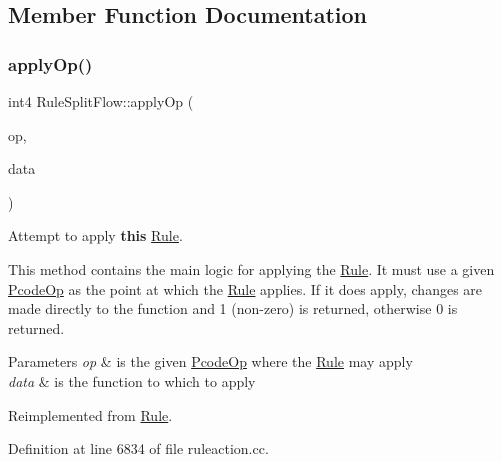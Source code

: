 \subsection{Member Function Documentation}
\mbox{\label{class_rule_split_flow_a7d4caa289d33f6ee12571bbc4abdc91d}} 
\subsubsection{\texorpdfstring{applyOp()}{applyOp()}}
{\footnotesize\ttfamily int4 Rule\+Split\+Flow\+::apply\+Op (\begin{DoxyParamCaption}\item[{\mbox{\hyperlink{class_pcode_op}{Pcode\+Op}} $\ast$}]{op,  }\item[{\mbox{\hyperlink{class_funcdata}{Funcdata}} \&}]{data }\end{DoxyParamCaption})\hspace{0.3cm}{\ttfamily [virtual]}}



Attempt to apply {\bfseries{this}} \mbox{\hyperlink{class_rule}{Rule}}. 

This method contains the main logic for applying the \mbox{\hyperlink{class_rule}{Rule}}. It must use a given \mbox{\hyperlink{class_pcode_op}{Pcode\+Op}} as the point at which the \mbox{\hyperlink{class_rule}{Rule}} applies. If it does apply, changes are made directly to the function and 1 (non-\/zero) is returned, otherwise 0 is returned. 
\begin{DoxyParams}{Parameters}
{\em op} & is the given \mbox{\hyperlink{class_pcode_op}{Pcode\+Op}} where the \mbox{\hyperlink{class_rule}{Rule}} may apply \\
\hline
{\em data} & is the function to which to apply \\
\hline
\end{DoxyParams}


Reimplemented from \mbox{\hyperlink{class_rule_a4e3e61f066670175009f60fb9dc60848}{Rule}}.



Definition at line 6834 of file ruleaction.\+cc.

